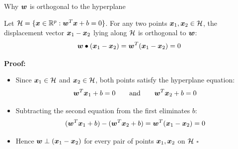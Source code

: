 \documentclass[aspectratio=169]{beamer}\usepackage[]{graphicx}\usepackage[]{xcolor}
\begin{document}
\begin{frame}[importantcolour]{Why $\bm{w}$ is orthogonal to the hyperplane}
    \begin{proposition}
        Let $\mathcal{H} = \{\bm{x} \in \mathbb{R}^p : \bm{w}^T \bm{x} + b = 0\}$. For any two points $\bm{x}_1, \bm{x}_2 \in \mathcal{H}$, the displacement vector $\bm{x}_1 - \bm{x}_2$ lying along $\mathcal{H}$ is orthogonal to $\bm{w}$:
        \[
            \bm{w} \bullet (\bm{x}_1 - \bm{x}_2) = \bm{w}^T(\bm{x}_1 - \bm{x}_2) = 0
        \]
    \end{proposition}
    \vfill
    \textbf{Proof:}
    \begin{itemize}
        \item Since $\bm{x}_1 \in \mathcal{H}$ and $\bm{x}_2 \in \mathcal{H}$, both points satisfy the hyperplane equation:
        \[
            \bm{w}^T \bm{x}_1 + b = 0 \qquad \text{and} \qquad \bm{w}^T \bm{x}_2 + b = 0
        \]
        \item Subtracting the second equation from the first eliminates $b$:
        \[
            (\bm{w}^T \bm{x}_1 + b) - (\bm{w}^T \bm{x}_2 + b) = \bm{w}^T(\bm{x}_1 - \bm{x}_2) = 0
        \]
        \item Hence $\bm{w} \perp (\bm{x}_1 - \bm{x}_2)$ for every pair of points $\bm{x}_1, \bm{x}_2$ on $\mathcal{H}$ \hfill $\square$
    \end{itemize}
\end{frame}
\end{document}
